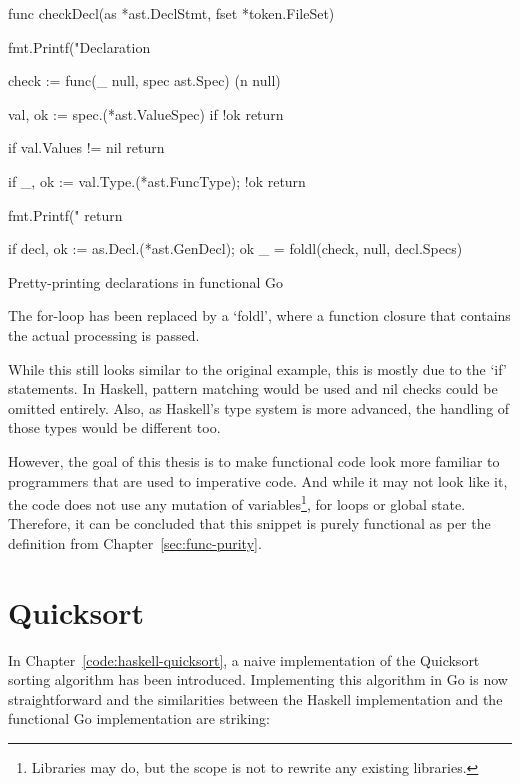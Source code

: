 \begin{code}
	\begin{gocode}
func checkDecl(as *ast.DeclStmt, fset *token.FileSet) {
	fmt.Printf("Declaration %

	check := func(_ null, spec ast.Spec) (n null) {
		val, ok := spec.(*ast.ValueSpec)
		if !ok {
			return
		}

		if val.Values != nil {
			return
		}

		if _, ok := val.Type.(*ast.FuncType); !ok {
			return
		}

		fmt.Printf("\tIdent %
		return
	}

	if decl, ok := as.Decl.(*ast.GenDecl); ok {
		_ = foldl(check, null{}, decl.Specs)
	}
}
\end{gocode}
	\caption{Pretty-printing declarations in functional Go}
\end{code}
The for-loop has been replaced by a `foldl', where a function closure
that contains the actual processing is passed.

While this still looks similar to the original example, this is mostly due to
the `if' statements. In Haskell, pattern matching would be used and nil checks
could be omitted entirely. Also, as Haskell's type system is more advanced, the
handling of those types would be different too.

However, the goal of this thesis is to make functional code look more familiar
to programmers that are used to imperative code.
And while it may not look like it, the code does not use any mutation of
variables\footnote{Libraries may do, but the scope is not to rewrite any existing
libraries.}, for loops or global state. Therefore, it can be concluded that this
snippet is purely functional as per the definition from Chapter~\ref{sec:func-purity}.

\section{Quicksort}

In Chapter~\ref{code:haskell-quicksort}, a naive implementation of the Quicksort sorting
algorithm has been introduced.
Implementing this algorithm in Go is now straightforward and the similarities between
the Haskell implementation and the functional Go implementation are striking:

